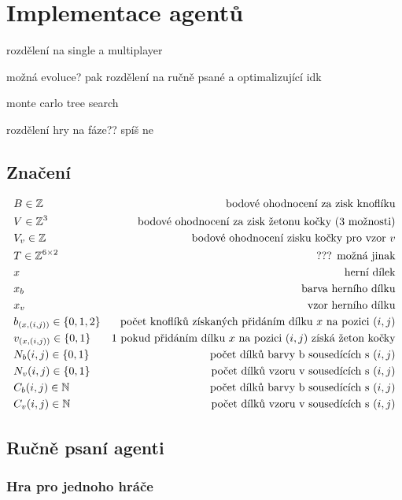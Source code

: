 \chapter{Implementace agentů}

rozdělení na single a multiplayer

možná evoluce? pak rozdělení na ručně psané a optimalizující idk

monte carlo tree search

rozdělení hry na fáze?? spíš ne

\section{Značení}
\begin{align*}
    &B \in \Bbb{Z} &\text{bodové ohodnocení za zisk knoflíku}\\
    &V \in \Bbb{Z}^3 &\text{bodové ohodnocení za zisk žetonu kočky (3 možnosti)}\\
    &V_v \in \Bbb{Z} &\text{bodové ohodnocení zisku kočky pro vzor } v\\
    &T \in \Bbb{Z}^{6\times2} &\text{??? možná jinak}\\
    &x &\text{herní dílek}\\
    &x_b &\text{barva herního dílku}\\
    &x_v &\text{vzor herního dílku}\\
    &b_{(x,(i,j))} \in \{0,1,2\} &\text{počet knoflíků získaných přidáním dílku $x$ na pozici $(i,j)$}\\
    &v_{(x,(i,j))} \in \{0,1\} &\text{$1$ pokud přidáním dílku $x$ na pozici $(i,j)$ získá žeton kočky}\\
    &N_b(i,j) \in \{0,1\} &\text{počet dílků barvy b sousedících s $(i,j)$}\\
    &N_v(i,j) \in \{0,1\} &\text{počet dílků vzoru v sousedících s $(i,j)$}\\
    &C_b(i,j) \in \mathbb{N} &\text{počet dílků barvy b sousedících s $(i,j)$}\\
    &C_v(i,j) \in \mathbb{N} &\text{počet dílků vzoru v sousedících s $(i,j)$}\\
\end{align*}

\section{Ručně psaní agenti}
\subsection{Hra pro jednoho hráče}

